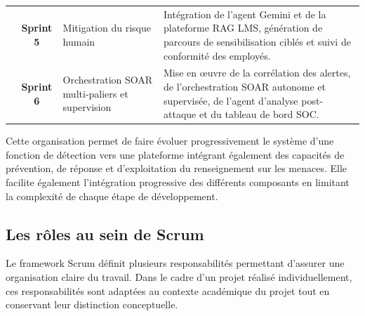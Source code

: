 \begin{xltabular}{\textwidth}{|c|c|>{\raggedright\arraybackslash}X|>{\raggedright\arraybackslash}X|}
& \textbf{Sprint 5} & Mitigation du risque humain &
Intégration de l'agent Gemini et de la plateforme RAG LMS, génération de parcours de sensibilisation ciblés et suivi de conformité des employés. \\ 

& \textbf{Sprint 6} & Orchestration SOAR multi-paliers et supervision &
Mise en œuvre de la corrélation des alertes, de l'orchestration SOAR autonome et supervisée, de l'agent d'analyse post-attaque et du tableau de bord SOC. \\ \hline

\end{xltabular}
Cette organisation permet de faire évoluer progressivement le système d'une fonction de détection vers une plateforme intégrant également des capacités de prévention, de réponse et d'exploitation du renseignement sur les menaces. Elle facilite également l'intégration progressive des différents composants en limitant la complexité de chaque étape de développement.

\subsection{Les rôles au sein de Scrum}

Le framework Scrum définit plusieurs responsabilités permettant d'assurer une organisation claire du travail. Dans le cadre d'un projet réalisé individuellement, ces responsabilités sont adaptées au contexte académique du projet tout en conservant leur distinction conceptuelle.


